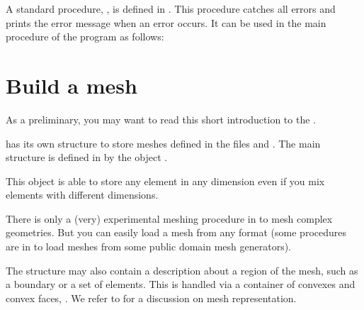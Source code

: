 \documentclass[a4paper,11pt,english]{sphinxmanual}
\begin{document}
A standard procedure, , is defined in
. This procedure catches all errors and prints the error
message when an error occurs. It can be used in the main procedure of the program
as follows:

\begin{sphinxVerbatim}[commandchars=\\\{\}]
  
   
       
   
\end{sphinxVerbatim}


\chapter{Build a mesh}
\label{\detokenize{userdoc/bmesh:build-a-mesh}}\label{\detokenize{userdoc/bmesh:ud-bmesh}}\label{\detokenize{userdoc/bmesh::doc}}
As a preliminary, you may want to read this short introduction to the 
.

 has its own structure to store meshes defined in the files
 and . The main
structure is defined in  by the object .

This object is able to store any element in any dimension even if you mix
elements with different dimensions.

There is only a (very) experimental meshing procedure in  to mesh complex geometries. But you can easily load a mesh from any format (some
procedures are in  to load meshes from some public
domain mesh generators).

The structure  may also contain a description about a region of the mesh,
such as a boundary or a set of elements. This is handled via a container of
convexes and convex faces, . We refer to  for a discussion on mesh representation.
\end{document}
